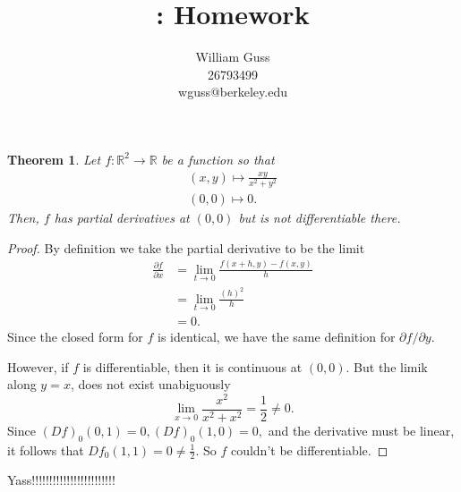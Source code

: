 \documentclass[letter]{article}
\title{\bCLASS: Homework \bHWN}
\author{William Guss\\26793499\\wguss@berkeley.edu}
\newtheorem{theorem}{Theorem}
\newenvironment{menumerate}{%
  \edef\backupindent{\the\parindent}%
  \enumerate%
  \setlength{\parindent}{\backupindent}%
}{\endenumerate}
\begin{document}
\maketitle
\thispagestyle{empty}

\begin{menumerate}
    \setcounter{enumi}{14}
    \item 
    \begin{theorem}
        Let $f: \mathbb{R}^2 \to \mathbb{R}$ be a function so that
        \begin{equation}
            \begin{aligned}
            (x,y) \mapsto \frac{xy}{x^2 + y^2} \\
            (0,0) \mapsto 0.          
            \end{aligned}          
        \end{equation}   
        Then, $f$ has partial derivatives at $(0,0)$ but is not differentiable
        there.
    \end{theorem}
    \begin{proof}
        By definition we take the partial derivative to be the limit
        \begin{equation}
            \begin{aligned}
            \frac{\partial f}{\partial x} &= \lim_{t\to 0} \frac{f(x+h, y) - f(x,y)}{h} \\
            &= \lim_{t\to 0} \frac{{(h)^2}}{h} \\
            &= 0.
            \end{aligned}
         \end{equation} 
         Since the closed form for $f$ is identical, we have the same definition
         for $\partial f / \partial y.$

         However, if $f$ is differentiable, then it is continuous at
         $(0,0).$ But the limik along $y = x$, does not exist unabiguously
         $$\lim_{x\to 0} \frac{x^2}{x^2 + x^2} = \frac12 \neq 0 .$$
         Since $(Df)_0(0,1) = 0, (Df)_0(1,0) = 0, $ and the derivative must be linear, it follows that $Df_0(1,1) = 0 \neq \frac12.$ So $f$
         couldn't be differentiable. 
    \end{proof}
    \item Yass!!!!!!!!!!!!!!!!!!!!!!!!
        

\end{menumerate}
\end{document}
